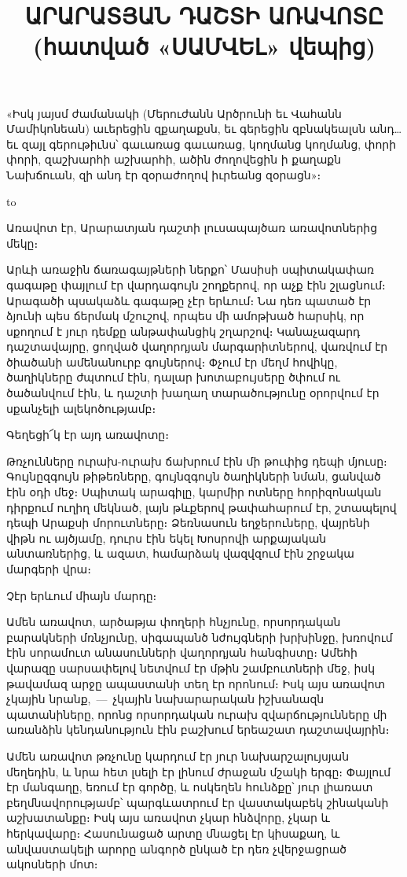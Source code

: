 \documentclass[12pt,a4paper]{article}
\title{ԱՐԱՐԱՏՅԱՆ ԴԱՇՏԻ ԱՌԱՎՈՏԸ\\
       \large(հատված \armbf{Րաֆֆու} «ՍԱՄՎԵԼ» վեպից)}
\author{}
\date{}
\begin{document}
\maketitle

{\leftskip=150pt\small
%
«Իսկ յայսմ ժամանակի (Մերուժանն Արծրունի եւ Վահանն Մամիկոնեան) աւերեցին
զքաղաքսն, եւ գերեցին զբնակեալսն անդ… եւ զայլ գերութիւնս՝ գաւառաց գաւառաց,
կողմանց կողմանց, փորի փո\-րի, զաշխարհի աշխարհի, ածին ժողովեցին ի քա\-ղաքն
Նախճուան, զի անդ էր զօրաժողով իւրեանց զօրացն»։
%
\par}

\bigskip

\hbox to 

\vskip 40pt

Առավոտ էր, Արարատյան դաշտի լուսապայծառ առավոտներից մեկը։

Արևի առաջին ճառագայթների ներքո՝ Մասիսի սպիտակափառ գագաթը փայլում էր վարդագույն
շողքերով, որ աչք էին շլացնում։ Արագածի պսակաձև գագաթը չէր երևում։ Նա դեռ պատած
էր ձյունի պես ճերմակ մշուշով, որպես մի ամոթխած հարսիկ, որ սքողում է յուր դեմքը
անթափանցիկ շղարշով։ Կանաչազարդ դաշտավայրը, ցողված վաղորդյան մարգարիտներով,
վառվում էր ծիածանի ամենանուրբ գույներով։ Փչում էր մեղմ հովիկը, ծաղիկները
ժպտում էին, դալար խոտաբույսերը ծփում ու ծածանվում էին, և դաշտի խա\-ղաղ
տարածությունը օրորվում էր սքանչելի ալեկոծությամբ։

Գեղեցի՜կ էր այդ առավոտը։

Թռչունները ուրախ-ուրախ ճախրում էին մի թուփից դեպի մյուսը։ Գույ\armuh նըզգույն
թիթեռները, գույնզգույն ծաղիկների նման, ցանված էին օդի մեջ։ Սպիտակ արագիլը,
կարմիր ոտները հորիզոնական դիրքում ուղիղ մեկնած, լայն թևքերով թափահարում էր,
շտապելով դեպի Արաքսի մորուտները։ Ձեռ\-նա\-սուն եղջերուները, վայրենի վիթն ու
այծյամը, դուրս էին եկել Խոսրովի արքայական անտառներից, և ազատ, համարձակ
վազվզում էին շրջակա մար\-գե\-րի վրա։

Չէր երևում միայն մարդը։

Ամեն առավոտ, արծաթյա փողերի հնչյունը, որսորդական բարակների մռնչյունը, սիգապանծ
նժույգների խրխինջը, խռովում էին սորամուտ ա\-նա\-սուն\-նե\-րի վաղորդյան
հանգիստը։ Ամեհի վարազը սարսափելով նետվում էր մթին շամբուտների մեջ, իսկ թավամազ
արջը ապաստանի տեղ էր որոնում։ Իսկ այս առավոտ չկային նրանք,~—~չկային
նախարարական իշխանազն պա\-տա\-նի\-նե\-րը, որոնց որսորդական ուրախ
զվարճությունները մի առանձին կեն\-դա\-նու\-թյուն էին բաշխում երեաշատ
դաշտավայրին։

Ամեն առավոտ թռչունը կարդում էր յուր նախարշալույսյան մեղեդին, և նրա հետ լսելի
էր լինում ժրաջան մշակի երգը։ Փայլում էր մանգաղը, եռում էր գործը, և ոսկեղեն
հունձքը՝ յուր լիառատ բեղմնավորությամբ՝ պարգևատրում էր վաստակաբեկ շինականի
աշխատանքը։ Իսկ այս առավոտ չկար հնձվորը, չկար և հերկավարը։ Հասունացած արտը
մնացել էր կիսաքաղ, և ան\-վաս\-տա\-կե\-լի արորը անգործ ընկած էր դեռ չվերջացրած
ակոսների մոտ։
\end{document}
